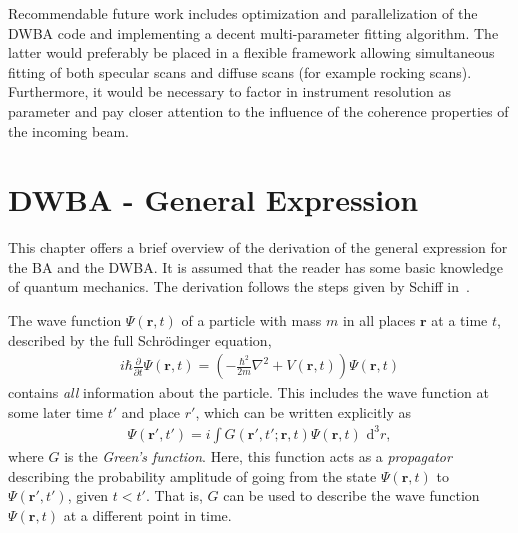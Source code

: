 \documentclass[10pt,twoside, b5paper,pdftex]{report}
\newcommand{\B}[1]{\left( #1 \right)}
\begin{document}
Recommendable future work includes optimization and parallelization of the DWBA code and implementing a decent multi-parameter fitting algorithm. The latter would preferably be placed in a flexible framework allowing simultaneous fitting of both specular scans and diffuse scans (for example rocking scans). Furthermore, it would be necessary to factor in instrument resolution as parameter and pay closer attention to the influence of the coherence properties of the incoming beam.





\newpage
{}
\appendix

\chapter{DWBA - General Expression \label{sec:dwba_general}}
This chapter offers a brief overview of the derivation of the general expression for the BA and the DWBA. It is assumed that the reader has some basic knowledge of quantum mechanics. The derivation follows the steps given by Schiff in~\cite{SCHIFF}.

The wave function $\Psi(\mathbf{r},t)$ of a particle with mass $m$ in all places $\mathbf{r}$ at a time $t$, described by the full Schrödinger equation,
\begin{align}
	i\hbar\frac{\partial}{\partial t}\Psi(\mathbf{r},t) = \B{-\frac{\hbar^{2}}{2m}\nabla^{2} + V(\mathbf{r},t)}\Psi(\mathbf{r},t) \label{eq:SEQ}
\end{align}
contains {\it all} information about the particle. This includes the wave function at some later time $t'$ and place $r'$, which can be written explicitly  as
\begin{align}
	\Psi( \mathbf{r}',t') = i\int G(\mathbf{r}',t';\mathbf{r},t)\Psi( \mathbf{r},t) \mbox{ d}^{3}r,
\end{align}
where $G$ is the {\it Green's function}. Here, this function acts as a {\it propagator} describing the probability amplitude of going from the state $\Psi(\mathbf{r},t)$ to $\Psi( \mathbf{r}',t')$, given $t < t'$. That is, $G$ can be used to describe the wave function $\Psi( \mathbf{r},t)$ at a different point in time.
\end{document}
